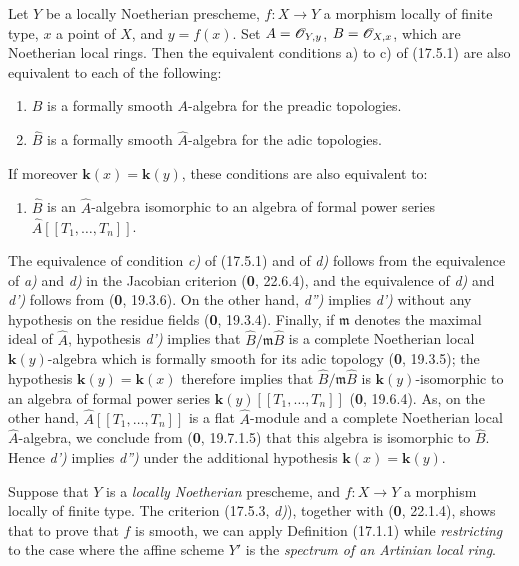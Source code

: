 \begin{proposition}[17.5.3]
\label{IV.17.5.3}
Let $Y$ be a \textup{locally Noetherian} prescheme, $f:X\to Y$ a morphism locally of finite type, $x$ a point of $X$, and $y=f(x)$. Set $A=\mathscr{O}_{Y,y}$, $B=\mathscr{O}_{X,x}$, which are Noetherian local rings. Then the equivalent conditions \textup{a)} to \textup{c)} of (17.5.1) are also equivalent to each of the following:
\begin{enumerate}
  \item[\textup{d)}] $B$ is a formally smooth $A$-algebra for the preadic topologies.
  \item[\textup{d$'$)}] $\widehat B$ is a formally smooth $\widehat A$-algebra for the adic topologies.
\end{enumerate}
If moreover $\boldsymbol{k}(x)=\boldsymbol{k}(y)$, these conditions are also equivalent to:
\begin{enumerate}
  \item[\textup{d$''$)}] $\widehat B$ is an $\widehat A$-algebra isomorphic to an algebra of formal power series $\widehat A[[T_1,\ldots,T_n]]$.
\end{enumerate}
\end{proposition}

The equivalence of condition \emph{c)} of (17.5.1) and of \emph{d)} follows from the equivalence of \emph{a)} and \emph{d)} in the Jacobian criterion (\textbf{0}, 22.6.4), and the equivalence of \emph{d)} and \emph{d')} follows from (\textbf{0}, 19.3.6). On the other hand, \emph{d'')} implies \emph{d')} without any hypothesis on the residue fields (\textbf{0}, 19.3.4). Finally, if $\mathfrak m$ denotes the maximal ideal of $\widehat A$, hypothesis \emph{d')} implies that $\widehat B/\mathfrak m\widehat B$ is a complete Noetherian local $\boldsymbol{k}(y)$-algebra which is formally smooth for its adic topology (\textbf{0}, 19.3.5); the hypothesis $\boldsymbol{k}(y)=\boldsymbol{k}(x)$ therefore implies that $\widehat B/\mathfrak m\widehat B$ is $\boldsymbol{k}(y)$-isomorphic to an algebra of formal power series $\boldsymbol{k}(y)[[T_1,\ldots,T_n]]$ (\textbf{0}, 19.6.4). As, on the other hand, $\widehat A[[T_1,\ldots,T_n]]$ is a flat $\widehat A$-module and a complete Noetherian local $\widehat A$-algebra, we conclude from (\textbf{0}, 19.7.1.5) that this algebra is isomorphic to $\widehat B$. Hence \emph{d')} implies \emph{d'')} under the additional hypothesis $\boldsymbol{k}(x)=\boldsymbol{k}(y)$.

\begin{remark}[17.5.4]
\label{IV.17.5.4}
Suppose that $Y$ is a \emph{locally Noetherian} prescheme, and $f:X\to Y$ a morphism locally of finite type. The criterion (17.5.3, \emph{d)}), together with (\textbf{0}, 22.1.4), shows that to prove that $f$ is smooth, we can apply Definition (17.1.1) while \emph{restricting} to the case where the affine scheme $Y'$ is the \emph{spectrum of an Artinian local ring}.
\end{remark}


